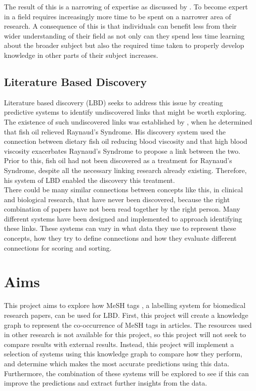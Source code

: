 \documentclass{l4proj}
\begin{document}
The result of this is a narrowing of expertise as discussed by \cite{swanson_fish_1986}. To become expert in a field requires increasingly more time to be spent on a narrower area of research. A consequence of this is that individuals can benefit less from their wider understanding of their field as not only can they spend less time learning about the broader subject but also the required time taken to properly develop knowledge in other parts of their subject increases.\\ 

\subsection{Literature Based Discovery}

Literature based discovery (LBD) seeks to address this issue by creating predictive systems to identify undiscovered links that might be worth exploring. The existence of such undiscovered links was established by \cite{swanson_fish_1986}, when he determined that fish oil relieved Raynaud's Syndrome. His discovery system used the connection between dietary fish oil reducing blood viscosity and that high blood viscosity exacerbates Raynaud's Syndrome to propose a link between the two. Prior to this, fish oil had not been discovered as a treatment for Raynaud's Syndrome, despite all the necessary linking research already existing. Therefore, his system of LBD enabled the discovery this treatment. \\

There could be many similar connections between concepts like this, in clinical and biological research, that have never been discovered, because the right combination of papers have not been read together by the right person. Many different systems have been designed and implemented to approach identifying these links. These systems can vary in what data they use to represent these concepts, how they try to define connections and how they evaluate different connections for scoring and sorting. \\

\section{Aims}

This project aims to explore how MeSH tags \citep{mesh_home}, a labelling system for biomedical research papers, can be used for LBD. First, this project will create a knowledge graph to represent the co-occurrence of MeSH tags in articles. The resources used in other research is not available for this project, so this project will not seek to compare results with external results. Instead, this project will implement a selection of systems using this knowledge graph to compare how they perform, and determine which makes the most accurate predictions using this data. Furthermore, the combination of these systems will be explored to see if this can improve the predictions and extract further insights from the data. \\ 
\end{document}

